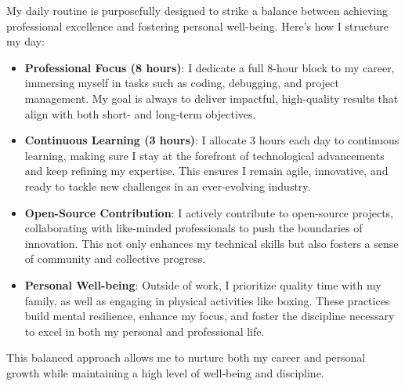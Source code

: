 

\divider

My daily routine is purposefully designed to strike a balance between achieving professional excellence and fostering personal well-being. Here's how I structure my day:

\begin{itemize}

  \item \textbf{Professional Focus (8 hours)}: I dedicate a full 8-hour block to my career, immersing myself in tasks such as coding, debugging, and project management. My goal is always to deliver impactful, high-quality results that align with both short- and long-term objectives.

  \item \textbf{Continuous Learning (3 hours)}: I allocate 3 hours each day to continuous learning, making sure I stay at the forefront of technological advancements and keep refining my expertise. This ensures I remain agile, innovative, and ready to tackle new challenges in an ever-evolving industry.

  \item \textbf{Open-Source Contribution}: I actively contribute to open-source projects, collaborating with like-minded professionals to push the boundaries of innovation. This not only enhances my technical skills but also fosters a sense of community and collective progress.

  \item \textbf{Personal Well-being}: Outside of work, I prioritize quality time with my family, as well as engaging in physical activities like boxing. These practices build mental resilience, enhance my focus, and foster the discipline necessary to excel in both my personal and professional life.

\end{itemize}

This balanced approach allows me to nurture both my career and personal growth while maintaining a high level of well-being and discipline.